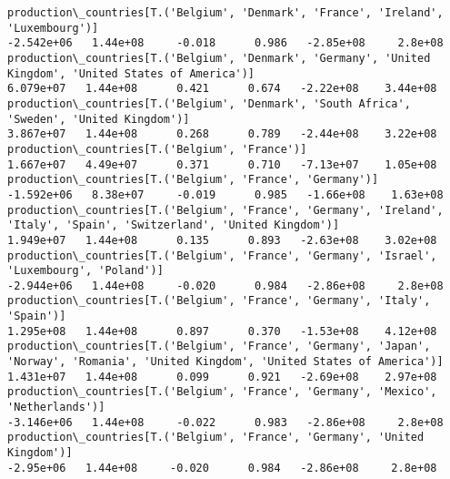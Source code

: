 \documentclass[11pt]{article}
\begin{document}
\begin{Verbatim}[commandchars=\\\{\}]
production\_countries[T.('Belgium', 'Denmark', 'France', 'Ireland', 'Luxembourg')]                                                                                                     -2.542e+06   1.44e+08     -0.018      0.986   -2.85e+08     2.8e+08
production\_countries[T.('Belgium', 'Denmark', 'Germany', 'United Kingdom', 'United States of America')]                                                                                6.079e+07   1.44e+08      0.421      0.674   -2.22e+08    3.44e+08
production\_countries[T.('Belgium', 'Denmark', 'South Africa', 'Sweden', 'United Kingdom')]                                                                                             3.867e+07   1.44e+08      0.268      0.789   -2.44e+08    3.22e+08
production\_countries[T.('Belgium', 'France')]                                                                                                                                          1.667e+07   4.49e+07      0.371      0.710   -7.13e+07    1.05e+08
production\_countries[T.('Belgium', 'France', 'Germany')]                                                                                                                              -1.592e+06   8.38e+07     -0.019      0.985   -1.66e+08    1.63e+08
production\_countries[T.('Belgium', 'France', 'Germany', 'Ireland', 'Italy', 'Spain', 'Switzerland', 'United Kingdom')]                                                                 1.949e+07   1.44e+08      0.135      0.893   -2.63e+08    3.02e+08
production\_countries[T.('Belgium', 'France', 'Germany', 'Israel', 'Luxembourg', 'Poland')]                                                                                            -2.944e+06   1.44e+08     -0.020      0.984   -2.86e+08     2.8e+08
production\_countries[T.('Belgium', 'France', 'Germany', 'Italy', 'Spain')]                                                                                                             1.295e+08   1.44e+08      0.897      0.370   -1.53e+08    4.12e+08
production\_countries[T.('Belgium', 'France', 'Germany', 'Japan', 'Norway', 'Romania', 'United Kingdom', 'United States of America')]                                                   1.431e+07   1.44e+08      0.099      0.921   -2.69e+08    2.97e+08
production\_countries[T.('Belgium', 'France', 'Germany', 'Mexico', 'Netherlands')]                                                                                                     -3.146e+06   1.44e+08     -0.022      0.983   -2.86e+08     2.8e+08
production\_countries[T.('Belgium', 'France', 'Germany', 'United Kingdom')]                                                                                                             -2.95e+06   1.44e+08     -0.020      0.984   -2.86e+08     2.8e+08

\end{Verbatim}
\end{document}

